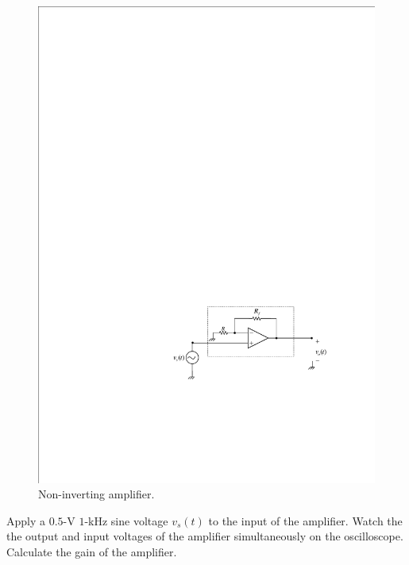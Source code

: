 \documentclass[11pt]{article}
\begin{document}
\begin{question}


    \begin{figure}[H]
        \centering
        \includegraphics[scale=1.2,angle=0]{Fig/cir4.pdf}
        \caption{Non-inverting amplifier.} \label{fig:cir4}
    \end{figure}

    \begin{subquestion}{Apply a $0.5$-V $1$-kHz sine voltage $v_{s}(t)$ to the input of the amplifier. Watch the the output and input voltages of the amplifier simultaneously on the oscilloscope. Calculate the gain of the amplifier.}
        \answer{}
    \end{subquestion}


\end{question}
\end{document}
